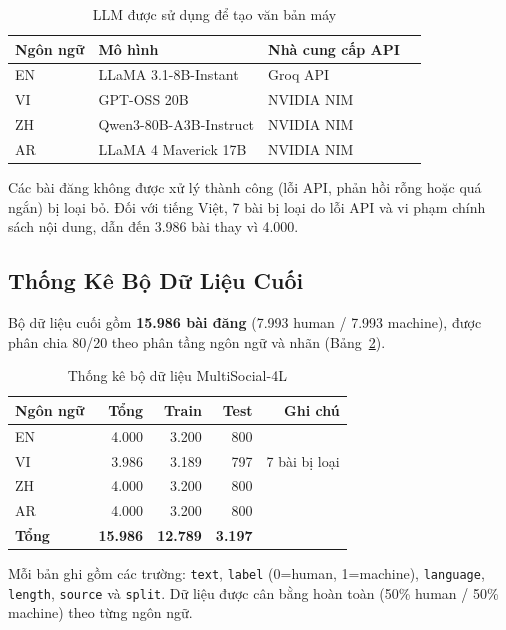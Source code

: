 \begin{table}[h]
\centering
\caption{LLM được sử dụng để tạo văn bản máy}
\label{tab:llms}
\begin{tabular}{llll}
\toprule
\textbf{Ngôn ngữ} & \textbf{Mô hình} & \textbf{Nhà cung cấp API} \\
\midrule
EN & LLaMA 3.1-8B-Instant      & Groq API \\
VI & GPT-OSS 20B               & NVIDIA NIM \\
ZH & Qwen3-80B-A3B-Instruct    & NVIDIA NIM \\
AR & LLaMA 4 Maverick 17B      & NVIDIA NIM \\
\bottomrule
\end{tabular}
\end{table}

Các bài đăng không được xử lý thành công (lỗi API, phản hồi rỗng hoặc
quá ngắn) bị loại bỏ. Đối với tiếng Việt, 7 bài bị loại do lỗi API
và vi phạm chính sách nội dung, dẫn đến 3.986 bài thay vì 4.000.

\subsection{Thống Kê Bộ Dữ Liệu Cuối}

Bộ dữ liệu cuối gồm \textbf{15.986 bài đăng} (7.993 human / 7.993
machine), được phân chia 80/20 theo phân tầng ngôn ngữ và nhãn
(Bảng~\ref{tab:dataset_stats}).

\begin{table}[h]
\centering
\caption{Thống kê bộ dữ liệu MultiSocial-4L}
\label{tab:dataset_stats}
\begin{tabular}{lrrrr}
\toprule
\textbf{Ngôn ngữ} & \textbf{Tổng} & \textbf{Train} & \textbf{Test} & \textbf{Ghi chú} \\
\midrule
EN & 4.000 & 3.200 & 800 & \\
VI & 3.986 & 3.189 & 797 & 7 bài bị loại \\
ZH & 4.000 & 3.200 & 800 & \\
AR & 4.000 & 3.200 & 800 & \\
\midrule
\textbf{Tổng} & \textbf{15.986} & \textbf{12.789} & \textbf{3.197} & \\
\bottomrule
\end{tabular}
\end{table}

Mỗi bản ghi gồm các trường: \texttt{text}, \texttt{label} (0=human,
1=machine), \texttt{language}, \texttt{length}, \texttt{source} và
\texttt{split}. Dữ liệu được cân bằng hoàn toàn (50\% human / 50\%
machine) theo từng ngôn ngữ.
